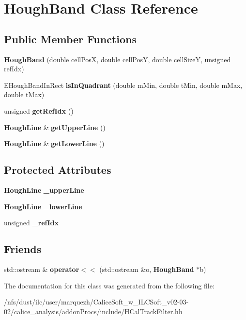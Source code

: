 \section{Hough\-Band Class Reference}
\label{classHoughBand}
\subsection*{Public Member Functions}
\begin{DoxyCompactItemize}
\item 
{\bfseries Hough\-Band} (double cell\-Pos\-X, double cell\-Pos\-Y, double cell\-Size\-Y, unsigned ref\-Idx)\label{classHoughBand_a0821953c357ce7aa3871d66bc7c975e7}

\item 
E\-Hough\-Band\-In\-Rect {\bfseries is\-In\-Quadrant} (double m\-Min, double t\-Min, double m\-Max, double t\-Max)\label{classHoughBand_a9efbff80bcfbdb5e077badda1a7eb881}

\item 
unsigned {\bfseries get\-Ref\-Idx} ()\label{classHoughBand_a05ef61d9c06e5a5744e248d22740d048}

\item 
{\bf Hough\-Line} \& {\bfseries get\-Upper\-Line} ()\label{classHoughBand_afe80f4557f14432646f05134e66fb988}

\item 
{\bf Hough\-Line} \& {\bfseries get\-Lower\-Line} ()\label{classHoughBand_a36af9693a9af207c6e095a32614251e4}

\end{DoxyCompactItemize}
\subsection*{Protected Attributes}
\begin{DoxyCompactItemize}
\item 
{\bf Hough\-Line} {\bfseries \-\_\-upper\-Line}\label{classHoughBand_abd8b7e63fe8cc4fc9031f63c9ec4c911}

\item 
{\bf Hough\-Line} {\bfseries \-\_\-lower\-Line}\label{classHoughBand_a2ae4ed2ebd5f0d1b88e16dd839452211}

\item 
unsigned {\bfseries \-\_\-ref\-Idx}\label{classHoughBand_aa7df5de3e1b3137f4233680e4c11c656}

\end{DoxyCompactItemize}
\subsection*{Friends}
\begin{DoxyCompactItemize}
\item 
std\-::ostream \& {\bfseries operator$<$$<$} (std\-::ostream \&o, {\bf Hough\-Band} $\ast$b)\label{classHoughBand_a0cbe62726613b8e453ab6ed4ecc6ddf3}

\end{DoxyCompactItemize}


The documentation for this class was generated from the following file\-:\begin{DoxyCompactItemize}
\item 
/nfs/dust/ilc/user/marquezh/\-Calice\-Soft\-\_\-w\-\_\-\-I\-L\-C\-Soft\-\_\-v02-\/03-\/02/calice\-\_\-analysis/addon\-Procs/include/H\-Cal\-Track\-Filter.\-hh\end{DoxyCompactItemize}
